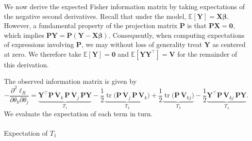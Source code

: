 \documentclass[
  letterpaper,
  DIV=11,
  numbers=noendperiod]{scrartcl}
\makeatletter
\let\oldparagraph\paragraph
\renewcommand{\paragraph}{
    \@ifstar
      \xxxParagraphStar
      \xxxParagraphNoStar
  }
\newcommand{\xxxParagraphStar}[1]{\oldparagraph*{#1}\mbox{}}
\newcommand{\xxxParagraphNoStar}[1]{\oldparagraph{#1}\mbox{}}
\makeatother
\begin{document}
We now derive the expected Fisher information matrix by taking
expectations of the negative second derivatives. Recall that under the
model, \(\mathbb{E}[\symbf{Y}] = \symbf{X}\symbf{\beta}\). However, a
fundamental property of the projection matrix \(\symbf{P}\) is that
\(\symbf{P}\symbf{X} = \symbf{0}\), which implies
\(\symbf{P}\symbf{Y} = \symbf{P}(\symbf{Y} - \symbf{X}\symbf{\beta})\).
Consequently, when computing expectations of expressions involving
\(\symbf{P}\), we may without loss of generality treat \(\symbf{Y}\) as
centered at zero. We therefore take
\(\mathbb{E}[\symbf{Y}] = \symbf{0}\) and
\(\mathbb{E}[\symbf{Y}\symbf{Y}^\top] = \symbf{V}\) for the remainder of
this derivation.

The observed information matrix is given by \begin{equation}
-\frac{\partial^2 \ell_R}{\partial \theta_k \partial \theta_j}
=
\underbrace{\symbf{Y}^\top \symbf{P}\,\dot{\symbf{V}}_k\,\symbf{P}\,\dot{\symbf{V}}_j\,\symbf{P} \symbf{Y}}_{T_1}
-\frac12 \underbrace{\operatorname{tr}\!\big( \symbf{P}\,\dot{\symbf{V}}_j\,\symbf{P}\,\dot{\symbf{V}}_k \big)}_{T_2}
+\frac12 \underbrace{\operatorname{tr}\!\big( \symbf{P}\,\ddot{\symbf{V}}_{kj} \big)}_{T_3}
- \frac12 \underbrace{\symbf{Y}^\top \symbf{P}\,\ddot{\symbf{V}}_{kj}\,\symbf{P}\symbf{Y}}_{T_4}.
\end{equation} We evaluate the expectation of each term in turn.

\paragraph{\texorpdfstring{Expectation of
\(T_1\)}{Expectation of T\_1}}\label{expectation-of-t_1}
\end{document}
